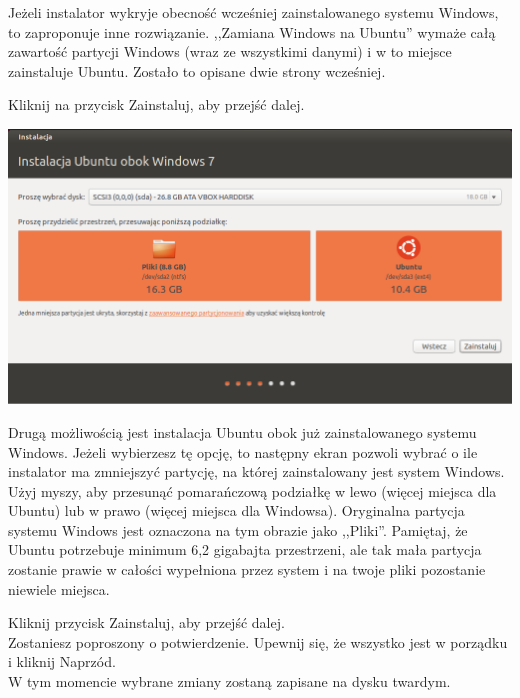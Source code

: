 Jeżeli instalator wykryje obecność wcześniej zainstalowanego systemu Windows, to zaproponuje inne rozwiązanie. ,,Zamiana Windows na Ubuntu'' wymaże całą zawartość partycji Windows (wraz ze wszystkimi danymi) i w to miejsce zainstaluje Ubuntu. Zostało to opisane dwie strony wcześniej.
\begin{flushright}
Kliknij na przycisk \textcolor{ubuntu_orange}{Zainstaluj}, aby przejść dalej.
\end{flushright}
\clearpage
\begin{center}
        \includegraphics[width=\linewidth]{images/instalator_partycjonowanie_obok_wondows7_2.png}
\end{center}

Drugą możliwością jest instalacja Ubuntu obok już zainstalowanego systemu Windows. Jeżeli wybierzesz tę opcję, to następny ekran pozwoli wybrać o ile instalator ma zmniejszyć partycję, na której zainstalowany jest system Windows. Użyj myszy, aby przesunąć pomarańczową podziałkę w lewo (więcej miejsca dla Ubuntu) lub w prawo (więcej miejsca dla Windowsa). Oryginalna partycja systemu Windows jest oznaczona na tym obrazie jako ,,Pliki''. Pamiętaj, że Ubuntu potrzebuje minimum 6,2 gigabajta przestrzeni, ale tak mała partycja zostanie prawie w całości wypełniona przez system i na twoje pliki pozostanie niewiele miejsca.
\begin{flushright}
Kliknij przycisk \textcolor{ubuntu_orange}{Zainstaluj}, aby przejść dalej.\\
Zostaniesz poproszony o potwierdzenie. Upewnij się, że wszystko jest w porządku i kliknij \textcolor{ubuntu_orange}{Naprzód}.\\
W tym momencie wybrane zmiany zostaną zapisane na dysku twardym.
\end{flushright}

